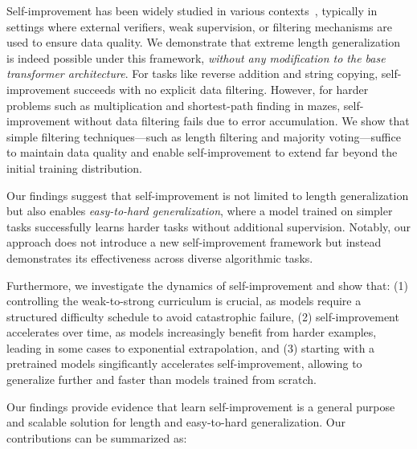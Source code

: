 Self-improvement has been widely studied in various contexts~\citep{singh2023beyond,gulcehre2023reinforced,liang2024sheep}, typically in settings where external verifiers, weak supervision, or filtering mechanisms are used to ensure data quality. We demonstrate that extreme length generalization is indeed possible under this framework, \textit{without any  modification to the base transformer architecture}. For tasks like reverse addition and string copying, self-improvement succeeds with no explicit data filtering. However, for harder problems such as multiplication and shortest-path finding in mazes, self-improvement without data filtering fails due to error accumulation. We show that simple filtering techniques—such as length filtering and majority voting—suffice to maintain data quality and enable self-improvement to extend far beyond the initial training distribution.

Our findings suggest that self-improvement is not limited to length generalization but also enables \textit{easy-to-hard generalization}, where a model trained on simpler tasks successfully learns harder tasks without additional supervision. Notably, our approach does not introduce a new self-improvement framework but instead demonstrates its effectiveness across diverse algorithmic tasks. 

Furthermore, we investigate the dynamics of self-improvement and show that: (1) controlling the weak-to-strong curriculum is crucial, as models require a structured difficulty schedule to avoid catastrophic failure, (2) self-improvement accelerates over time, as models increasingly benefit from harder examples, leading in some cases to exponential extrapolation, and (3) starting with a pretrained models singificantly accelerates self-improvement, allowing to generalize further and faster than models trained from scratch. 

Our findings provide evidence that learn self-improvement is a general purpose and scalable solution for length and easy-to-hard generalization. Our contributions can be summarized as:

